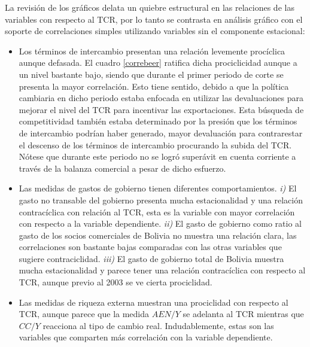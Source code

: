 \documentclass[12pt,letterpaper]{article}
\begin{document}
La revisión de los gráficos delata un quiebre estructural en las relaciones de las variables con respecto al TCR, por lo tanto se contrasta en análisis gráfico con el soporte de correlaciones simples utilizando variables sin el componente estacional:
\begin{itemize}
\item Los términos de intercambio presentan una relación levemente procíclica aunque defasada. El cuadro \ref{correbeer} ratifica dicha prociclicidad aunque a un nivel bastante bajo, siendo que durante el primer periodo de corte se presenta la mayor correlación. Esto tiene sentido, debido a que la política cambiaria en dicho periodo estaba enfocada en utilizar las devaluaciones para mejorar el nivel del TCR para incentivar las exportaciones. Esta búsqueda de competitividad también estaba determinado por la presión que los términos de intercambio podrían haber generado, mayor devaluación para contrarestar el descenso de los términos de intercambio procurando la subida del TCR. Nótese que durante este periodo no se logró superávit en cuenta corriente a través de la balanza comercial a pesar de dicho esfuerzo.
\item Las medidas de gastos de gobierno tienen diferentes comportamientos. \emph{i)} El gasto no transable del gobierno presenta mucha estacionalidad y una relación contracíclica con relación al TCR, esta es la variable con mayor correlación con respecto a la variable dependiente. \emph{ii)} El gasto de gobierno como ratio al gasto de los socios comerciales de Bolivia no muestra una relación clara, las correlaciones son bastante bajas comparadas con las otras variables que sugiere contraciclidad. \emph{iii)} El gasto de gobierno total de Bolivia muestra mucha estacionalidad y parece tener una relación contracíclica con respecto al TCR, aunque previo al 2003 se ve cierta prociclidad.
\item  Las medidas de riqueza externa muestran una prociclidad con respecto al TCR, aunque parece que la medida $AEN/Y$ se adelanta al TCR mientras que $CC/Y$ reacciona al tipo de cambio real. Indudablemente, estas son las variables que comparten más correlación con la variable dependiente.
\end{itemize}
\end{document}
